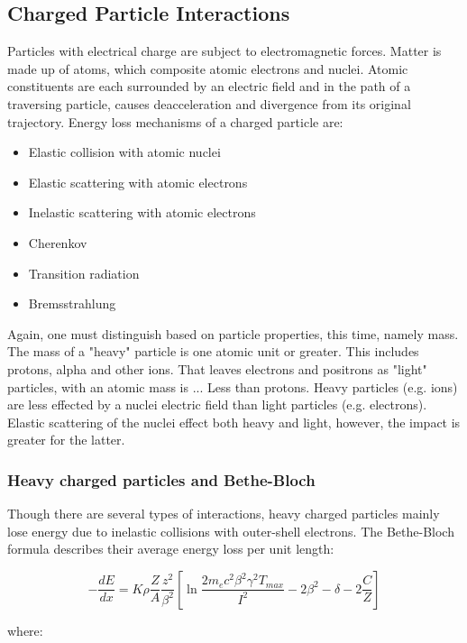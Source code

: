 \subsection{Charged Particle Interactions}
Particles with electrical charge are subject to electromagnetic forces. Matter is made up of atoms, which composite atomic electrons and nuclei. Atomic constituents are each surrounded by an electric field and in the path of a traversing particle, causes deacceleration and divergence from its original trajectory. Energy loss mechanisms of a charged particle are:
\begin{itemize}[noitemsep]
  \item Elastic collision with atomic nuclei
	\item Elastic scattering with atomic electrons
	\item Inelastic scattering with atomic electrons
	\item Cherenkov
	\item Transition radiation
	\item Bremsstrahlung
\end{itemize}

Again, one must distinguish based on particle properties, this time, namely mass.
The mass of a "heavy" particle is one atomic unit or greater. This includes protons, alpha and other ions. That leaves electrons and positrons as "light" particles, with an atomic mass is ... Less than protons. Heavy particles (e.g. ions) are less effected by a nuclei electric field than light particles (e.g. electrons). Elastic scattering of the nuclei effect both heavy and light, however, the impact is greater for the latter.

\subsubsection{Heavy charged particles and Bethe-Bloch}
Though there are several types of interactions, heavy charged particles mainly lose energy due to inelastic collisions with outer-shell electrons. The Bethe-Bloch formula describes their average energy loss per unit length:

\begin{equation} \label{Bethe-Bloch}
  - \frac{dE}{dx} = K \rho \frac{Z}{A} \frac{z^2}{\beta^2} \left[  \ln{\frac{2 m_e c^2 \beta^2 \gamma^2 T_{max}}{I^2}} - 2\beta^2 - \delta-2\frac{C}{Z}\right]
\end{equation}

where:


